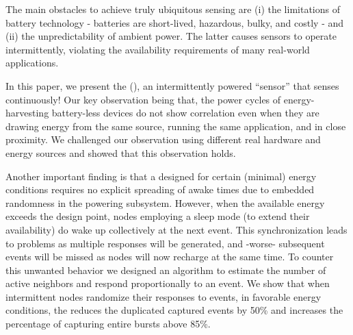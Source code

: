 The main obstacles to achieve truly ubiquitous sensing are (i) the limitations of battery technology - batteries are short-lived, hazardous, bulky, and costly - and (ii) the unpredictability of ambient power. The latter causes sensors to operate intermittently, violating the availability requirements of many real-world applications. 

In this paper, we present the \textit{\fullcis} (\cis), an intermittently powered ``sensor'' that senses continuously!
Our key observation being that, the power cycles of energy-harvesting battery-less devices do not show correlation even when they are drawing energy from the same source, running the same application, and in close proximity.
We challenged our observation using different real hardware and energy sources and showed that this observation holds.

Another important finding is that a \cis designed for certain (minimal) energy conditions requires no explicit spreading of awake times due to embedded randomness in the powering subsystem. However, when the available energy exceeds the design point, nodes employing a sleep mode (to extend their availability) do wake up collectively at the next event. This synchronization leads to problems as multiple responses will be generated, and -worse- subsequent events will be missed as nodes will now recharge at the same time.
To counter this unwanted behavior we designed an algorithm to estimate the number of active neighbors and respond proportionally to an event. 
We show that when intermittent nodes randomize their responses to events, in favorable energy conditions, the \cis reduces the duplicated captured events by 50\% and increases the percentage of capturing entire bursts above 85\%. 
